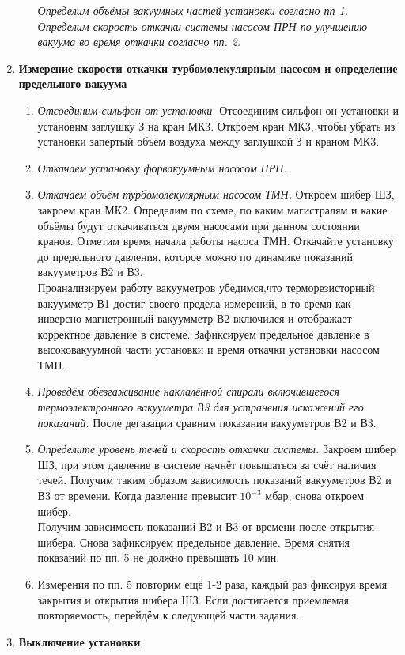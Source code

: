 \documentclass[a4paper,12pt]{article} %
\begin{document}
\begin{enumerate}
\begin{enumerate}
	\emph{Определим объёмы вакуумных частей установки согласно пп 1. Определим скорость откачки системы насосом ПРН по улучшению вакуума во время откачки согласно пп. 2.}
	
\end{enumerate}

\item \textbf{Измерение скорости откачки турбомолекулярным насосом и определение предельного вакуума}
\begin{enumerate}
	\item \textit{Отсоединим сильфон от установки.} Отсоединим сильфон он установки и установим заглушку З на кран МК3. Откроем кран МК3, чтобы убрать из установки запертый объём воздуха между заглушкой З и краном МК3.
	\item \textit{Откачаем установку форвакуумным насосом ПРН.}
	\item \textit{Откачаем объём турбомолекулярным насосом ТМН.} Откроем  шибер ШЗ,  закроем  кран МК2.  Определим  по схеме, по каким магистралям и какие объёмы будут откачиваться двумя насосами при данном состоянии кранов. Отметим время начала работы насоса ТМН. Откачайте  установку  до  предельного  давления,  которое  можно по динамике показаний вакууметров В2 и В3. \\
	Проанализируем работу вакууметров убедимся,что терморезисторный  вакуумметр В1  достиг  своего  предела  измерений, в то время как инверсно-магнетронный вакуумметр В2 включился и отображает  корректное  давление  в системе.  Зафиксируем  предельное  давление в высоковакуумной части установки и время откачки установки насосом ТМН. 
	\item \textit{Проведём обезгаживание наклалённой спирали включившегося термоэлектронного вакууметра В3 для устранения искажений его показаний.} После дегазации сравним показания вакууметров В2 и В3.
	\item \textit{Определите уровень течей и скорость откачки системы.} Закроем  шибер  ШЗ,  при  этом  давление  в  системе  начнёт  повышаться за счёт наличия течей. Получим таким образом зависимость показаний вакууметров В2 и В3 от времени. Когда давление превысит $10^{-3}$ мбар, снова откроем шибер. \\ 
	Получим зависимость показаний В2 и В3 от времени после открытия шибера. Снова зафиксируем предельное давление. Время снятия показаний по пп. 5 не должно превышать 10 мин.
	\item Измерения  по пп. 5  повторим  ещё 1-2  раза,  каждый  раз  фиксируя время закрытия и открытия шибера ШЗ. Если  достигается  приемлемая  повторяемость,  перейдём к следующей части задания.  
\end{enumerate}

\item \textbf{Выключение установки }

\end{enumerate}
\end{document}
